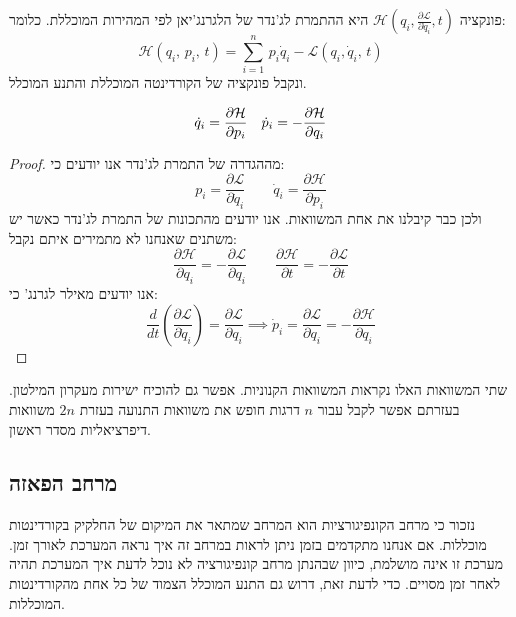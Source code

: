 \documentclass{tstextbook}
\begin{document}
\begin{definition}[המילטוניאן]
פונקציה \(\mathcal{\mathcal{H}}\left( q_{i},\frac{\partial \mathcal{\mathcal{L}} } {\partial \dot{q}_{i}},t \right)\) היא ההתמרת לג'נדר של הלגרנג'יאן לפי המהירות המוכללת. כלומר:
$$\mathcal{\mathcal{H}}(q_{i},\,p_{i},\,t)=\sum_{i=1}^{n}\,p_{i}{\dot{q}}_{i}-\mathcal{L}(q_{i},{\dot{q}}_{i},\,t)$$
ונקבל פונקציה של הקורדינטה המוכללת והתנע המוכלל.

\end{definition}
\begin{theorem}
$$\begin{array}{c c}{{\dot{q}_{i}=\displaystyle\frac{\partial \mathcal{\mathcal{H}}}{\partial p_{i}}}}& {{\dot{p}_{i}=-\displaystyle\frac{\partial \mathcal{\mathcal{H}}}{\partial q_{i}}}}\end{array}$$

\end{theorem}
\begin{proof}
מההגדרה של התמרת לג'נדר אנו יודעים כי:
$$p_{i}=\frac{\partial \mathcal{L}}{\partial\dot{q}_{i}}\quad\quad\dot{q}_{i}=\frac{\partial \mathcal{\mathcal{H}}}{\partial p_{i}}$$
ולכן כבר קיבלנו את אחת המשוואות. אנו יודעים מהתכונות של התמרת לג'נדר כאשר יש משתנים שאנחנו לא מתמירים איתם נקבל:
$${\frac{\partial \mathcal{\mathcal{H}}}{\partial q_{i}}}=-{\frac{\partial \mathcal{L}}{\partial q_{i}}}\quad\quad{\frac{\partial \mathcal{\mathcal{H}}}{\partial t}}=-{\frac{\partial \mathcal{L}}{\partial t}}$$
אנו יודעים מאילר לגרנג' כי:
$$\frac{d}{d t}\left(\frac{\partial \mathcal{L}}{\partial\dot{q}_{i}}\right)=\frac{\partial \mathcal{L}}{\partial q_{i}}\implies \dot{p}_{i}=\frac{\partial \mathcal{L}}{\partial q_{i}}=-\frac{\partial \mathcal{\mathcal{H}}}{\partial q_{i}}$$

\end{proof}
שתי המשוואות האלו נקראות המשוואות הקנוניות. אפשר גם להוכיח ישירות מעקרון המילטון. בעזרתם אפשר לקבל עבור \(n\) דרגות חופש את משוואות התנועה בעזרת \(2n\) משוואות דיפרציאליות מסדר ראשון. 

\subsection{מרחב הפאזה}

נזכור כי מרחב הקונפיגורציות הוא המרחב שמתאר את המיקום של החלקיק בקורדינטות מוכללות. אם אנחנו מתקדמים בזמן ניתן לראות במרחב זה איך נראה המערכת לאורך זמן. מערכת זו אינה מושלמת, כיוון שבהנתן מרחב קונפיגורציה לא נוכל לדעת איך המערכת תהיה לאחר זמן מסויים. כדי לדעת זאת, דרוש גם התנע המוכלל הצמוד של כל אחת מהקורדינטות המוכללות.
\end{document}
